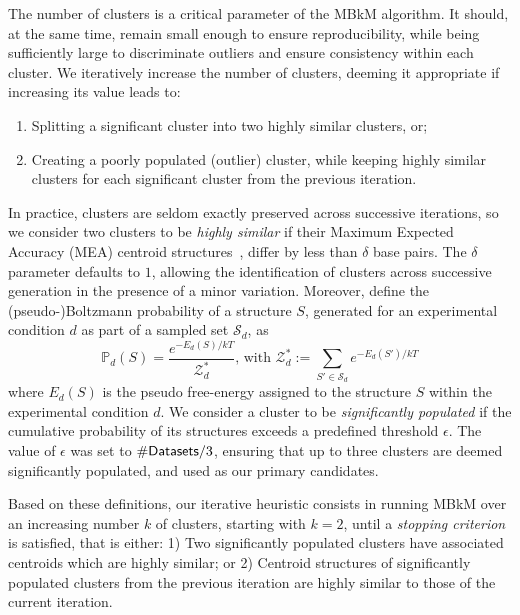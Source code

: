 \documentclass[a4,center,fleqn]{NAR}
\newcommand{\CL}{MBkM\xspace}
\newcommand{\NumClust}{k}
\newcommand{\Def}[1]{{\em #1}}
\begin{document}
The number of clusters is a critical parameter of the \CL{} algorithm. It should, at the same time, remain small enough to ensure reproducibility, while being sufficiently large to discriminate outliers and ensure consistency within each cluster. We iteratively increase the number of clusters, deeming it appropriate if increasing its value leads to:
\begin{enumerate} 
	\item Splitting a significant cluster into two highly similar clusters, or; 
	\item Creating a poorly populated (outlier) cluster, while keeping highly similar clusters for each significant cluster from the previous iteration.
\end{enumerate} 
In practice, clusters are seldom exactly preserved across successive iterations, so we consider two clusters to be \Def{highly similar} if their Maximum Expected Accuracy (MEA) centroid structures~\citep{Lu2009}, differ by less than $\delta$ base pairs.
The $\delta$ parameter defaults to $1$, allowing the identification of clusters across successive generation in the presence of a minor variation.
Moreover, define the (pseudo-)Boltzmann probability of a structure $S$, generated for an experimental condition $d$ as part of a sampled set $\mathcal{S}_d$, as
\[\mathbb{P}_d(S) = \frac{e^{-E_d(S)/kT}}{\mathcal{Z}^*_d} \text{, with } \mathcal{Z}^*_d := \sum_{S'\in \mathcal{S}_d} e^{-E_d(S')/kT}\]
where $E_d(S)$ is the pseudo free-energy assigned to the structure $S$ within the experimental condition $d$.
We consider a cluster to be \Def{significantly populated} if the cumulative probability of its structures exceeds a predefined threshold $\epsilon$. 
The value of $\epsilon$ was set to $\#{\sf Datasets}/3$, ensuring that up to three clusters are deemed significantly populated, and used as our primary candidates.

Based on these definitions, our iterative heuristic consists in running \CL over an increasing number $\NumClust$ of clusters, starting with $\NumClust=2$, until a \Def{stopping criterion} is satisfied, that is either: 1) Two significantly populated clusters have associated centroids which are highly similar; or 2) Centroid structures of significantly populated clusters from the previous iteration are highly similar to those of the current iteration.
\end{document}
